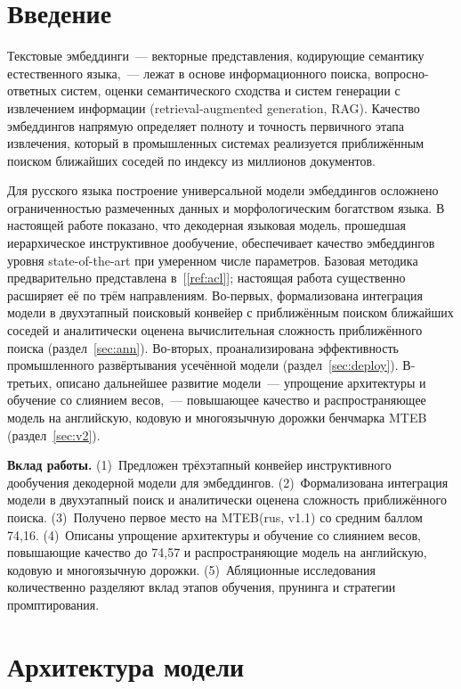 \documentclass[12pt,a4paper]{article}
\begin{document}
\section{Введение}
Текстовые эмбеддинги~--- векторные представления, кодирующие семантику
естественного языка,~--- лежат в основе информационного поиска,
вопросно-ответных систем, оценки семантического сходства и систем генерации с
извлечением информации (retrieval-augmented generation, RAG). Качество
эмбеддингов напрямую определяет полноту и точность первичного этапа извлечения,
который в промышленных системах реализуется приближённым поиском ближайших
соседей по индексу из миллионов документов.

Для русского языка построение универсальной модели эмбеддингов осложнено
ограниченностью размеченных данных и морфологическим богатством языка.
В настоящей работе показано, что декодерная языковая модель, прошедшая
иерархическое инструктивное дообучение, обеспечивает качество эмбеддингов уровня
state-of-the-art при умеренном числе параметров. Базовая методика
предварительно представлена в~[\ref{ref:acl}]; настоящая работа существенно
расширяет её по трём направлениям. Во-первых, формализована интеграция модели в
двухэтапный поисковый конвейер с приближённым поиском ближайших соседей и
аналитически оценена вычислительная сложность приближённого поиска
(раздел~\ref{sec:ann}). Во-вторых, проанализирована эффективность промышленного
развёртывания усечённой модели (раздел~\ref{sec:deploy}). В-третьих, описано
дальнейшее развитие модели~--- упрощение архитектуры и обучение со слиянием
весов,~--- повышающее качество и распространяющее модель на английскую, кодовую
и многоязычную дорожки бенчмарка MTEB (раздел~\ref{sec:v2}).

\textbf{Вклад работы.} (1)~Предложен трёхэтапный конвейер инструктивного
дообучения декодерной модели для эмбеддингов. (2)~Формализована интеграция
модели в двухэтапный поиск и аналитически оценена сложность приближённого
поиска. (3)~Получено первое место на MTEB(rus, v1.1) со средним баллом 74,16.
(4)~Описаны упрощение архитектуры и обучение со слиянием весов, повышающие
качество до 74,57 и распространяющие модель на английскую, кодовую и
многоязычную дорожки. (5)~Абляционные исследования количественно разделяют
вклад этапов обучения, прунинга и стратегии промптирования.

\section{Архитектура модели}\label{sec:arch}
\end{document}
